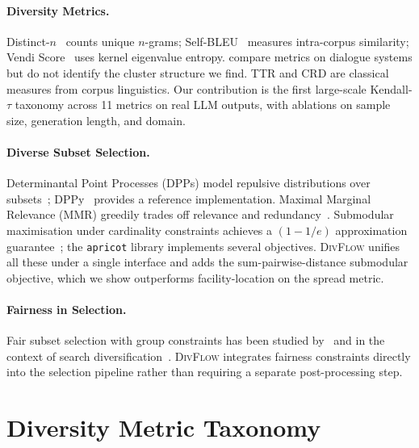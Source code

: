 \documentclass[11pt]{article}
\begin{document}
\paragraph{Diversity Metrics.}
Distinct-$n$~\citep{li2016diversity} counts unique $n$-grams;
Self-BLEU~\citep{zhu2018texygen} measures intra-corpus similarity;
Vendi Score~\citep{friedman2023vendi} uses kernel eigenvalue entropy.
\citet{tevet2021evaluating} compare metrics on dialogue systems
but do not identify the cluster structure we find.
TTR and CRD are classical measures from corpus linguistics.
Our contribution is the first large-scale Kendall-$\tau$ taxonomy
across 11 metrics on real LLM outputs, with ablations on sample
size, generation length, and domain.

\paragraph{Diverse Subset Selection.}
Determinantal Point Processes (DPPs) model repulsive distributions
over subsets~\citep{kulesza2012determinantal}; DPPy~\citep{gautier2019dppy}
provides a reference implementation. Maximal Marginal Relevance (MMR)
greedily trades off relevance and redundancy~\citep{carbonell1998mmr}.
Submodular maximisation under cardinality constraints achieves a
$(1-1/e)$ approximation guarantee~\citep{nemhauser1978analysis};
the \texttt{apricot} library implements several objectives.
\textsc{DivFlow} unifies all these under a single interface and adds
the sum-pairwise-distance submodular objective, which we show
outperforms facility-location on the spread metric.

\paragraph{Fairness in Selection.}
Fair subset selection with group constraints has been studied
by~\citet{celis2018multiwinner} and in the context of search
diversification~\citep{santos2010exploiting}. \textsc{DivFlow}
integrates fairness constraints directly into the selection pipeline
rather than requiring a separate post-processing step.

\section{Diversity Metric Taxonomy}
\label{sec:taxonomy}
\end{document}
